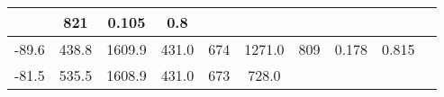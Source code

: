 \documentclass[a4paper,10pt]{article}
\begin{document}
\begin{longtable}{
     |
%    
    c|
%    
    c|
%    
    c|
%    
    c|
%    
    c|
%    
    c|
%    
    c|
%    
    c|
%    
    c|
%    
    c|
%    
    }
%        
        & 821
%        

%        

%        
        & 0.105
%        

%        

%        
        & 0.8
%        

%        
        \\
        \hline

        

%        

%        
        -89.6
%        

%        

%        
        & 438.8
%        

%        

%        
        & 1609.9
%        

%        

%        
        & 431.0
%        

%        

%        
        & 674
%        

%        

%        
        & 1271.0
%        

%        

%        
        & 809
%        

%        

%        
        & 0.178
%        

%        

%        
        & 0.815
%        

%        
        \\
        \hline

        

%        

%        
        -81.5
%        

%        

%        
        & 535.5
%        

%        

%        
        & 1608.9
%        

%        

%        
        & 431.0
%        

%        

%        
        & 673
%        

%        

%        
        & 728.0
%        

%        


\end{longtable}
\end{document}
